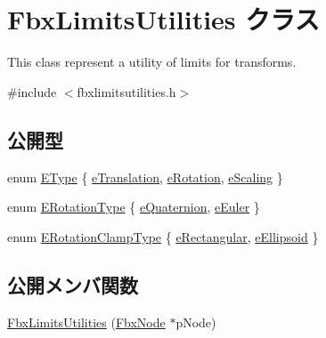 \hypertarget{class_fbx_limits_utilities}{}\section{Fbx\+Limits\+Utilities クラス}
\label{class_fbx_limits_utilities}


This class represent a utility of limits for transforms.  




{\ttfamily \#include $<$fbxlimitsutilities.\+h$>$}

\subsection*{公開型}
\begin{DoxyCompactItemize}
\item 
enum \hyperlink{class_fbx_limits_utilities_aa55167751039b3d64b56cb7e58f2e62c}{E\+Type} \{ \hyperlink{class_fbx_limits_utilities_aa55167751039b3d64b56cb7e58f2e62cad5f4a235b05c5125317da39da0a500a4}{e\+Translation}, 
\hyperlink{class_fbx_limits_utilities_aa55167751039b3d64b56cb7e58f2e62caec36a0e6c35ad607d141dce69825b880}{e\+Rotation}, 
\hyperlink{class_fbx_limits_utilities_aa55167751039b3d64b56cb7e58f2e62ca1167d6156a651d47a02a5cd53fe175a8}{e\+Scaling}
 \}
\item 
enum \hyperlink{class_fbx_limits_utilities_a8c1ec432e195d91eae2548fbc98c8770}{E\+Rotation\+Type} \{ \hyperlink{class_fbx_limits_utilities_a8c1ec432e195d91eae2548fbc98c8770a23e246527e2e7002e7761b80a782d3ff}{e\+Quaternion}, 
\hyperlink{class_fbx_limits_utilities_a8c1ec432e195d91eae2548fbc98c8770a9d5b4fecb8bd1f6a68746799d8c7c8d7}{e\+Euler}
 \}
\item 
enum \hyperlink{class_fbx_limits_utilities_a6724e1b0b6ba776ecb0c66e7b0ed075d}{E\+Rotation\+Clamp\+Type} \{ \hyperlink{class_fbx_limits_utilities_a6724e1b0b6ba776ecb0c66e7b0ed075da0bca9b07722c907bfa4de6bd618f1a23}{e\+Rectangular}, 
\hyperlink{class_fbx_limits_utilities_a6724e1b0b6ba776ecb0c66e7b0ed075da03110a5bd9a356f666df030ed80d9e42}{e\+Ellipsoid}
 \}
\end{DoxyCompactItemize}
\subsection*{公開メンバ関数}
\begin{DoxyCompactItemize}
\item 
\hyperlink{class_fbx_limits_utilities_a375046bf32ce52b180249e3524ca5731}{Fbx\+Limits\+Utilities} (\hyperlink{class_fbx_node}{Fbx\+Node} $\ast$p\+Node)
\end{DoxyCompactItemize}
